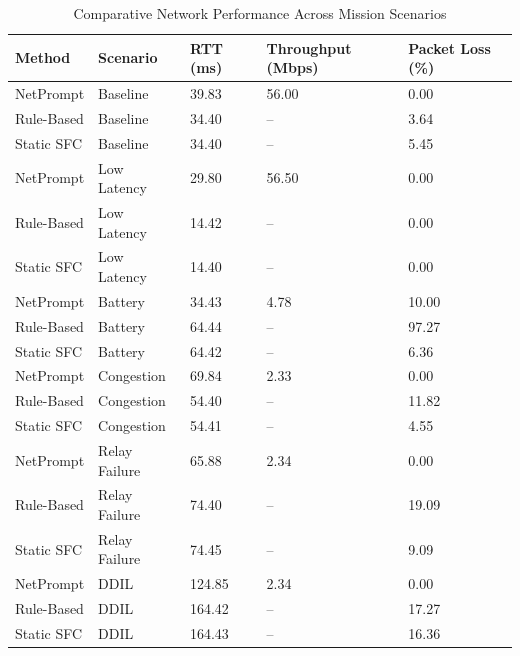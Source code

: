\begin{table}[t]
\caption{Comparative Network Performance Across Mission Scenarios}
\label{tab:performance}
\centering
\small
\begin{tabular}{lllll}
\toprule
Method & Scenario & RTT (ms) & Throughput (Mbps) & Packet Loss (\%) \\
\midrule
NetPrompt & Baseline & 39.83 & 56.00 & 0.00 \\
Rule-Based & Baseline & 34.40 & -- & 3.64 \\
Static SFC & Baseline & 34.40 & -- & 5.45 \\
NetPrompt & Low Latency & 29.80 & 56.50 & 0.00 \\
Rule-Based & Low Latency & 14.42 & -- & 0.00 \\
Static SFC & Low Latency & 14.40 & -- & 0.00 \\
NetPrompt & Battery & 34.43 & 4.78 & 10.00 \\
Rule-Based & Battery & 64.44 & -- & 97.27 \\
Static SFC & Battery & 64.42 & -- & 6.36 \\
NetPrompt & Congestion & 69.84 & 2.33 & 0.00 \\
Rule-Based & Congestion & 54.40 & -- & 11.82 \\
Static SFC & Congestion & 54.41 & -- & 4.55 \\
NetPrompt & Relay Failure & 65.88 & 2.34 & 0.00 \\
Rule-Based & Relay Failure & 74.40 & -- & 19.09 \\
Static SFC & Relay Failure & 74.45 & -- & 9.09 \\
NetPrompt & DDIL & 124.85 & 2.34 & 0.00 \\
Rule-Based & DDIL & 164.42 & -- & 17.27 \\
Static SFC & DDIL & 164.43 & -- & 16.36 \\
\bottomrule
\end{tabular}
\end{table}
